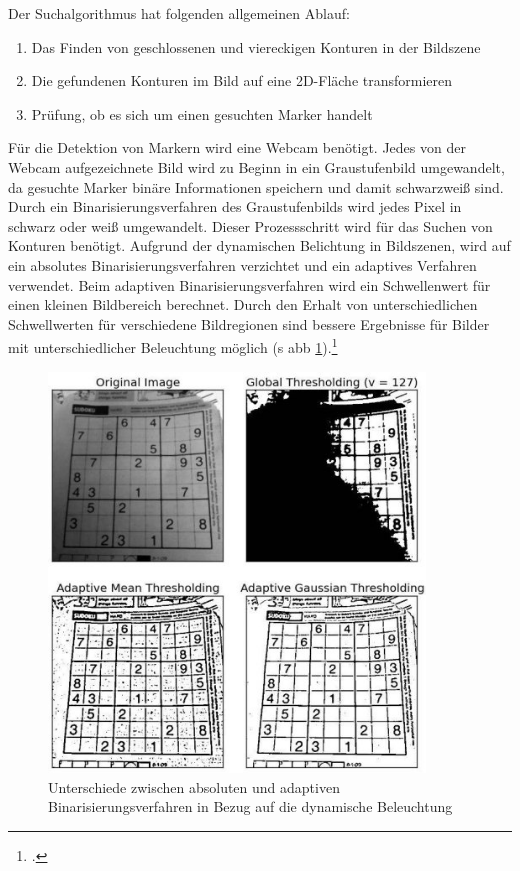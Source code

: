 \newpage

Der Suchalgorithmus hat folgenden allgemeinen Ablauf:

\begin{enumerate}
\item Das Finden von geschlossenen und viereckigen Konturen in der Bildszene
\item Die gefundenen Konturen im Bild auf eine 2D-Fläche transformieren
\item Prüfung, ob es sich um einen gesuchten Marker handelt
\end{enumerate}

\noindent Für die Detektion von Markern wird eine Webcam benötigt. Jedes von der Webcam aufgezeichnete Bild wird zu Beginn in ein Graustufenbild umgewandelt, da gesuchte Marker binäre Informationen speichern und damit schwarzweiß sind. Durch ein Binarisierungsverfahren des Graustufenbilds wird jedes Pixel in schwarz oder weiß umgewandelt. Dieser Prozessschritt wird für das Suchen von Konturen benötigt. Aufgrund der dynamischen Belichtung in Bildszenen, wird auf ein absolutes Binarisierungsverfahren verzichtet und ein adaptives Verfahren verwendet. Beim adaptiven Binarisierungsverfahren wird ein Schwellenwert für einen kleinen Bildbereich berechnet. Durch den Erhalt von unterschiedlichen Schwellwerten für verschiedene Bildregionen sind bessere Ergebnisse für Bilder mit unterschiedlicher Beleuchtung möglich (\acs{s} \acs{abb} \ref{fig:AdaptiveThresholding}).\footcite{AdaptiveThresholdingDescription}

\begin{figure}[H]
\centering
\includegraphics[width=10cm]{Bilder/Implementierung/AdaptiveThresholding.jpg}
\caption[Unterschiede zwischen absoluten und adaptiven Binarisierungsverfahren in Bezug auf die dynamische Beleuchtung]{Unterschiede zwischen absoluten und adaptiven Binarisierungsverfahren in Bezug auf die dynamische Beleuchtung\protect\footnotemark}
\label{fig:AdaptiveThresholding}
\end{figure}

